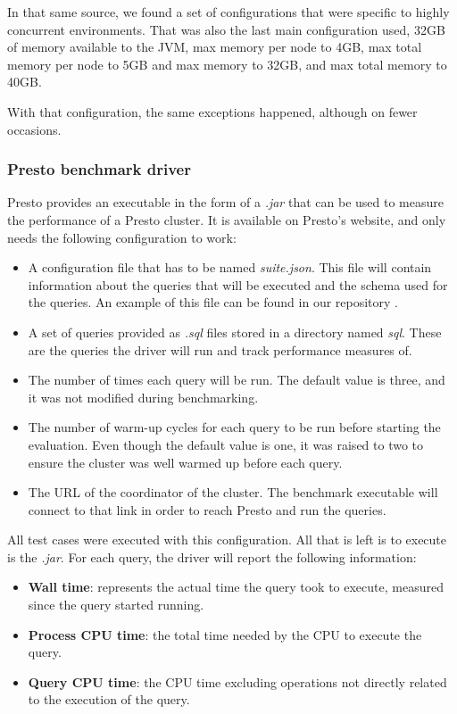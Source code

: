 \documentclass[conference]{IEEEtran}
\begin{document}
In that same source, we found a set of configurations that were specific to highly concurrent environments. That was also the last main configuration used, 32GB of memory available to the JVM, max memory per node to 4GB, max total memory per node to 5GB and max memory to 32GB, and max total memory to 40GB.

With that configuration, the same exceptions happened, although on fewer occasions.

\subsubsection{Presto benchmark driver}
Presto provides an executable in the form of a \textit{.jar} that can be used to measure the performance of a Presto cluster. It is available on Presto's website, and only needs the following configuration to work:

\begin{itemize}
    \item A configuration file that has to be named \textit{suite.json}. This file will contain information about the queries that will be executed and the schema used for the queries. An example of this file can be found in our repository \cite{perez-rodriguez-2021}.
    \item A set of queries provided as \textit{.sql} files stored in a directory named \textit{sql}. These are the queries the driver will run and track performance measures of.
    \item The number of times each query will be run. The default value is three, and it was not modified during benchmarking.
    \item The number of warm-up cycles for each query to be run before starting the evaluation. Even though the default value is one, it was raised to two to ensure the cluster was well warmed up before each query.
    \item The URL of the coordinator of the cluster. The benchmark executable will connect to that link in order to reach Presto and run the queries.
\end{itemize}

All test cases were executed with this configuration. All that is left is to execute is the \textit{.jar}. For each query, the driver will report the following information:

\begin{itemize}
    \item \textbf{Wall time}: represents the actual time the query took to execute, measured since the query started running.
    \item \textbf{Process CPU time}: the total time needed by the CPU to execute the query.
    \item \textbf{Query CPU time}: the CPU time excluding operations not directly related to the execution of the query.
\end{itemize}
\end{document}
